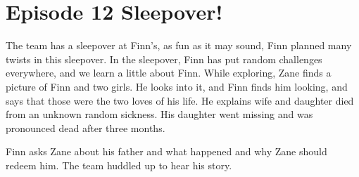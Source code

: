 \documentclass[12pt, letterpaper]{article}
\begin{document}
\section*{Episode 12 Sleepover!}
The team has a sleepover at Finn’s, as fun as it may sound, Finn planned many twists in this sleepover. 
In the sleepover, Finn has put random challenges everywhere, and we learn a little about Finn. While exploring, 
Zane finds a picture of Finn and two girls. He looks into it, and Finn finds him looking, and says that those were the two loves of his life. 
He explains wife and daughter died from an unknown random sickness. His daughter went missing and was pronounced dead after three months.

Finn asks Zane about his father and what happened and why Zane should redeem him. The team huddled up to hear his story.
\end{document}
